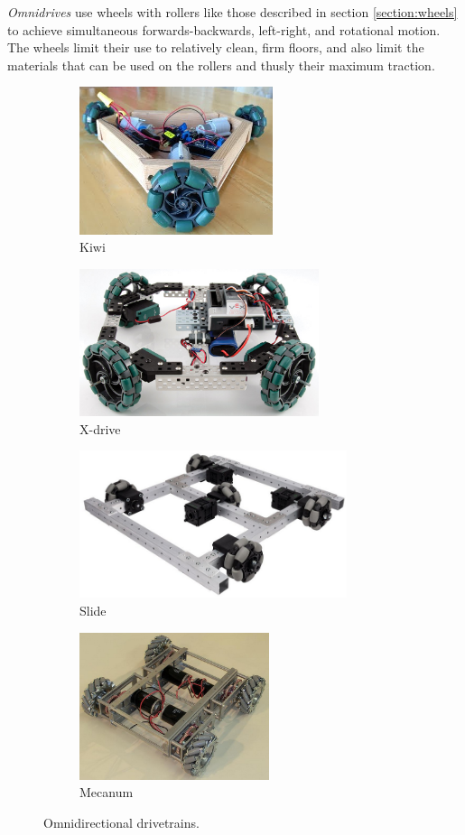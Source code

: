 \documentclass[10pt,letterpaper]{book}
\begin{document}
\textit{Omnidrives} use wheels with rollers like those described in section \ref{section:wheels} to achieve simultaneous forwards-backwards, left-right, and rotational motion. The wheels limit their use to relatively clean, firm floors, and also limit the materials that can be used on the rollers and thusly their maximum traction.

\begin{figure}[H]
\begin{subfigure}[b]{.45\linewidth}
	\includegraphics[height=1.7in]{imgs/drivetrain_kiwi.png}
	\caption{Kiwi}
\end{subfigure}\begin{subfigure}[b]{.45\linewidth}
	\includegraphics[height=1.7in]{imgs/drivetrain_killough.jpeg}
	\caption{X-drive}
\end{subfigure}

\begin{subfigure}[b]{.45\linewidth}
	\includegraphics[height=1.7in]{imgs/drivetrain_slide.png}
	\caption{Slide}
\end{subfigure}\begin{subfigure}[b]{.45\linewidth}
	\includegraphics[height=1.7in]{imgs/drivetrain_mecanum.png}
	\caption{Mecanum}
\end{subfigure}
\caption{Omnidirectional drivetrains.}
\end{figure}
\end{document}

